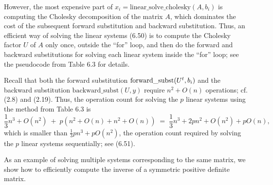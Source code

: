 However, the most expensive part of $x_i = \text{linear\_solve\_cholesky}(A,b_i)$ is
computing the Cholesky decomposition of the matrix $A$, which dominates the cost of the
subsequent forward substitution and backward substitution. Thus, an efficient way of
solving the linear systems (6.50) is to compute the Cholesky factor $U$ of $A$ only
once, outside the ``for'' loop, and then do the forward and backward substitutions for
solving each linear system inside the ``for'' loop; see the pseudocode from Table 6.3
for details.

Recall that both the forward substitution $\text{forward\_subst}(U^{t},b_i)$ and the
backward substitution $\text{backward\_subst}(U,y)$ require $n^2 + O(n)$ operations;
cf. (2.8) and (2.19). Thus, the operation count for solving the $p$ linear systems
using the method from Table 6.3 is
\[
\frac{1}{3}n^3 + O(n^2) \;+\; p\left(n^2+O(n) + n^2+O(n)\right)
\;=\; \frac{1}{3}n^3 + 2pn^2 + O(n^2) + pO(n),
\]
which is smaller than $\frac{1}{3}pn^3 + pO(n^2)$, the operation count required by
solving the $p$ linear systems sequentially; see (6.51).

As an example of solving multiple systems corresponding to the same matrix, we show
how to efficiently compute the inverse of a symmetric positive definite matrix.

\begin{table}[H]
\centering
\caption{Solution of multiple linear systems corresponding to the same spd matrix}
\end{table}

